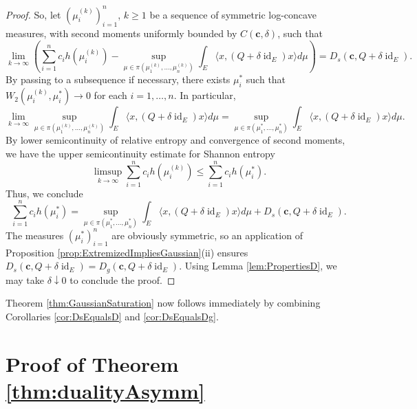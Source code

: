 \documentclass[10pt]{article}
\newcommand{\id}{\operatorname{id}}
\begin{document}
\begin{proof}
So, let $(\mu_i^{(k)})_{i=1}^n$, $k\geq 1$ be a sequence of symmetric log-concave measures, with second moments uniformly bounded by $C(\mathbf{c},\delta)$, such that 
$$
\lim_{k\to \infty} \left( \sum_{i=1}^n c_i h(\mu^{(k)}_i) - \sup_{\mu \in \pi(\mu^{(k)}_1, \dots, \mu^{(k)}_n) } \int_E \langle x, (Q+ \delta\id_E) x\rangle d\mu\right)  =  D_s(\mathbf{c},Q+ \delta \id_E).  
$$
By passing to a subsequence if necessary, there exists  $\mu_i^*$ such that $W_2(\mu_i^{(k)}, \mu_i^*)\to 0$ for each $i=1,\dots, n$.  In particular,  
$$
\lim_{k\to\infty} \sup_{\mu \in \pi(\mu^{(k)}_1, \dots, \mu^{(k)}_n)} \int_E \langle x, (Q+ \delta\id_E) x\rangle d\mu = 
 \sup_{\mu \in \pi(\mu^{*}_1, \dots, \mu^{*}_n)} \int_E \langle x, (Q+ \delta\id_E) x\rangle d\mu .
$$
By lower semicontinuity of relative entropy and convergence of second moments, we have  the upper semicontinuity estimate for Shannon entropy
$$
\limsup_{k\to \infty} \sum_{i=1}^n c_i h(\mu^{(k)}_i)  \leq  \sum_{i=1}^n c_i h(\mu^{*}_i) .
$$
Thus, we conclude 
$$
 \sum_{i=1}^n c_i h(\mu^{*}_i)   =  \sup_{\mu \in \pi(\mu^{*}_1, \dots, \mu^{*}_n) } \int_E \langle x, (Q+ \delta\id_E) x\rangle d\mu  + D_s(\mathbf{c},Q+ \delta \id_E).
$$
The measures $(\mu_i^*)_{i=1}^n$ are obviously symmetric, so an application of Proposition \ref{prop:ExtremizedImpliesGaussian}(ii) ensures $D_s(\mathbf{c},Q+\delta \id_E) = D_g(\mathbf{c},Q+\delta \id_E)$.  Using Lemma \ref{lem:PropertiesD}, we may take $\delta\downarrow 0$ to conclude the proof. 
\end{proof}

Theorem \ref{thm:GaussianSaturation}   now follows immediately  by combining  Corollaries \ref{cor:DsEqualsD} and \ref{cor:DsEqualsDg}.

\section{Proof of Theorem \ref{thm:dualityAsymm}}
\end{document}
